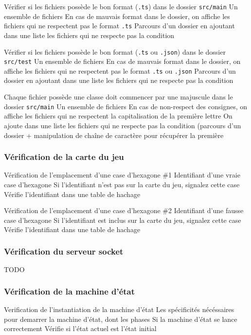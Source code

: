 \mytest
{Vérifier si les fichiers possède le bon format (\texttt{.ts}) dans le dossier \texttt{src/main}}
{Un ensemble de fichiers}
{En cas de mauvais format dans le dossier, on affiche les fichiers qui ne respectent pas le format \texttt{.ts}}
{Parcours d'un dossier en ajoutant dans une liste les fichiers qui ne respecte pas la condition}

\mytest
{Vérifier si les fichiers possède le bon format (\texttt{.ts} ou \texttt{.json}) dans le dossier \texttt{src/test}}
{Un ensemble de fichiers}
{En cas de mauvais format dans le dossier, on affiche les fichiers qui ne respectent pas le format \texttt{.ts} ou \texttt{.json}}
{Parcours d'un dossier en ajoutant dans une liste les fichiers qui ne respecte pas la condition}

\mytest
{Chaque fichier possède une classe doit commencer par une majuscule dans le dossier \texttt{src/main}}
{Un ensemble de fichiers}
{En cas de non-respect des consignes, on affiche les fichiers qui ne respectent la capitalisation de la première lettre}
{On ajoute dans une liste les fichiers qui ne respecte pas la condition (parcours d'un dossier + manipulation de chaîne de caractère pour récupérer la première}

\subsubsection{Vérification de la carte du jeu}

\mytest
{Vérification de l'emplacement d'une case d'hexagone \#1}
{Identifiant d'une vraie case d'hexagone}
{Si l'identifiant n'est pas sur la carte du jeu, signalez cette case}
{Vérifie l'identifiant dans une table de hachage}

\mytest
{Vérification de l'emplacement d'une case d'hexagone \#2}
{Identifiant d'une fausse case d'hexagone}
{Si l'identifiant est inclus sur la carte du jeu, signalez cette case}
{Vérifie l'identifiant dans une table de hachage}

\subsubsection{Vérification du serveur socket}

TODO

\subsubsection{Vérification de la machine d'état}
\mytest
{Verification de l'instantiation de la machine d'état}
{Les spécificités nécéssaires pour demarrer la machine d'état, dont les phases}
{Si la machine d'état se lance correctement}
{Vérifie si l'état actuel est l'état initial}


